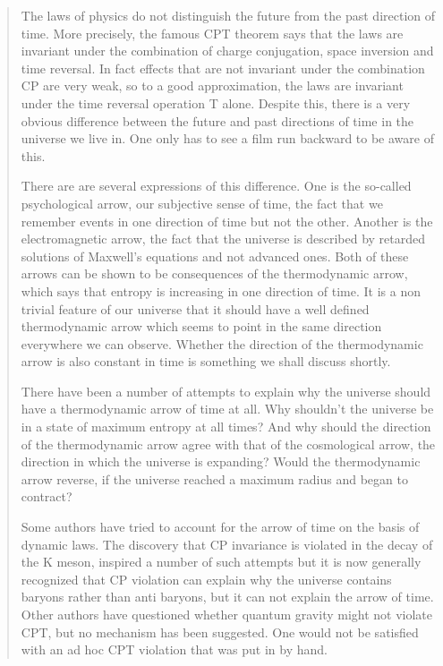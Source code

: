\documentclass[12pt]{article}
\begin{document}
\begin{quote}
The laws of physics do not distinguish the future from the past
direction of time. More precisely, the famous CPT theorem says that the
laws are invariant under the combination of charge conjugation, space
inversion and time reversal. In fact effects that are not invariant
under the combination CP are very weak, so to a good approximation, the
laws are invariant under the time reversal operation T alone. Despite
this, there is a very obvious difference between the future and past
directions of time in the universe we live in. One only has to see a
film run backward to be aware of this.

There are are several expressions of this difference. One is the
so-called psychological arrow, our subjective sense of time, the fact
that we remember events in one direction of time but not the other.
Another is the electromagnetic arrow, the fact that the universe is
described by retarded solutions of Maxwell's equations and not advanced
ones. Both of these arrows can be shown to be consequences of the
thermodynamic arrow, which says that entropy is increasing in one
direction of time. It is a non trivial feature of our universe that it
should have a well defined thermodynamic arrow which seems to point in
the same direction everywhere we can observe. Whether the direction of
the thermodynamic arrow is also constant in time is something we shall
discuss shortly.

There have been a number of attempts to explain why the universe should
have a thermodynamic arrow of time at all. Why shouldn't the universe be
in a state of maximum entropy at all times? And why should the direction
of the thermodynamic arrow agree with that of the cosmological arrow,
the direction in which the universe is expanding? Would the
thermodynamic arrow reverse, if the universe reached a maximum radius
and began to contract?

Some authors have tried to account for the arrow of time on the basis of
dynamic laws. The discovery that CP invariance is violated in the decay
of the K meson, inspired a number of such attempts but it is now
generally recognized that CP violation can explain why the universe
contains baryons rather than anti baryons, but it can not explain the
arrow of time. Other authors have questioned whether quantum gravity
might not violate CPT, but no mechanism has been suggested. One would
not be satisfied with an ad hoc CPT violation that was put in by hand.


\end{quote}
\end{document}
